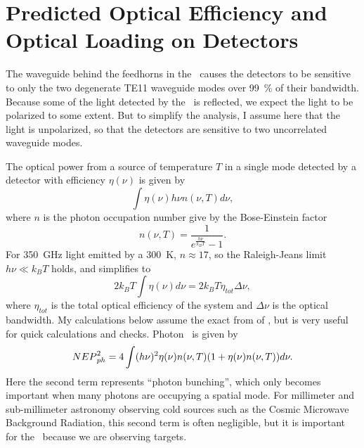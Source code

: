 \section{Predicted Optical Efficiency and Optical Loading on Detectors} \label{sec:ch4-opt-eff}

The waveguide behind the feedhorns in the \Imager\ causes the detectors to be sensitive to only the two degenerate TE11 waveguide modes over \SI{99}{\percent} of their bandwidth.
Because some of the light detected by the \Imager\ is reflected, we expect the light to be polarized to some extent.
But to simplify the analysis, I assume here that the light is unpolarized, so that the detectors are sensitive to two uncorrelated waveguide modes.

The optical power from a source of temperature $T$ in a single mode detected by a detector with efficiency $\eta(\nu)$ is given by \cite{zmuidzinas_thermal_2003,richards_bolometers_1994}
\begin{equation} \label{eqn:ch4-power-per-mode}
  \int \eta(\nu) h \nu n(\nu,T) d \nu ,
\end{equation}
where $n$ is the photon occupation number give by the Bose-Einstein factor
\begin{equation} \label{eqn:ch4-photon-n}
  n(\nu,T) = \frac{1}{e^{\frac{h \nu}{k_B T}} -1}.
\end{equation}
For \SI{350}{\GHz} light emitted by a \SI{300}{\K}, $n \approx 17$, so the Raleigh-Jeans limit $h \nu \ll k_B T$ holds, and  simplifies to
\begin{equation} \label{eqn:ch4-power-per-mode-rj}
  2 k_B T \int \eta(\nu) d \nu = 2 k_B T \eta_{tot} \Delta \nu,
\end{equation}
where $\eta_{tot}$ is the total optical efficiency of the system and $\Delta \nu$ is the optical bandwidth.
My calculations below assume the exact from of , but  is very useful for quick calculations and checks.
Photon \NEP\ is given by \cite[Equation~51]{zmuidzinas_thermal_2003}
\begin{equation} \label{eqn:ch4-photon-nep}
  {NEP}^2_{ph} = 4 \int (h \nu)^2 \eta(\nu) n(\nu,T) (1 + \eta(\nu) n(\nu,T)) d \nu.
\end{equation}
Here the second term represents ``photon bunching'', which only becomes important when many photons are occupying a spatial mode.
For millimeter and sub-millimeter astronomy observing cold sources such as the Cosmic Microwave Background Radiation, this second term is often negligible, but it is important for the \Imager\ because we are observing  targets.

